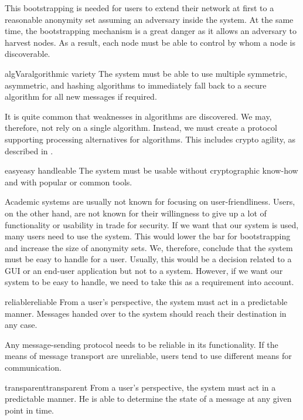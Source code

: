This bootstrapping is needed for users to extend their network at first to a reasonable anonymity set assuming an adversary inside the system. At the same time, the bootstrapping mechanism is a great danger as it allows an adversary to harvest nodes. As a result, each node must be able to control by whom a node is discoverable.

\begin{requirement}{algVar}{algorithmic variety}
	The system must be able to use multiple symmetric, asymmetric, and hashing algorithms to immediately fall back to a secure algorithm for all new messages if required. 
\end{requirement}

It is quite common that weaknesses in algorithms are discovered. We may, therefore, not rely on a single algorithm. Instead, we must create a protocol supporting processing alternatives for algorithms. This includes crypto agility, as described in \cite{bsiPostQuantum}.

\begin{requirement}{easy}{easy handleable}
	The system must be usable without cryptographic know-how and with popular or common tools.
\end{requirement}

Academic systems are usually not known for focusing on user-friendliness. Users, on the other hand, are not known for their willingness to give up a lot of functionality or usability in trade for security. If we want that our system is used, many users need to use the system. This would lower the bar for bootstrapping and increase the size of anonymity sets. We, therefore, conclude that the system must be easy to handle for a user. Usually, this would be a decision related to a GUI or an end-user application but not to a system. However, if we want our system to be easy to handle, we need to take this as a requirement into account.

\begin{requirement}{reliable}{reliable}
	From a user's perspective, the system must act in a predictable manner. Messages handed over to the system should reach their destination in any case.
\end{requirement}

Any message-sending protocol needs to be reliable in its functionality. If the means of message transport are unreliable, users tend to use different means for communication\cite{zhou2011examining}. 

\begin{requirement}{transparent}{transparent}
	From a user's perspective, the system must act in a predictable manner. He is able to determine the state of a message at any given point in time.
\end{requirement}

